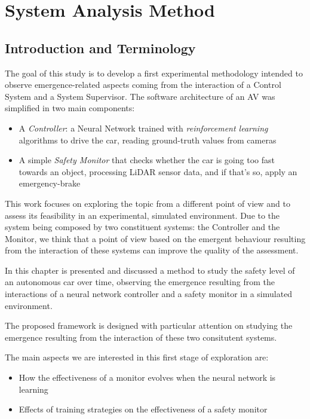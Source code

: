 \chapter{System Analysis Method}

\section{Introduction and Terminology}

The goal of this study is to develop a first experimental methodology intended to observe emergence-related aspects coming from the interaction of a Control System and a System Supervisor.\newline
The software architecture of an AV was simplified in two main components:

\begin{itemize}
	\item A \textsl{Controller}: a Neural Network trained with \textsl{reinforcement learning} algorithms to drive the car, reading ground-truth values from cameras
	\item A simple \textsl{Safety Monitor} that checks whether the car is going too fast towards an object, processing LiDAR sensor data, and if that's so, apply an emergency-brake
\end{itemize}

This work focuses on exploring the topic from a different point of view and to assess its feasibility in an experimental, simulated environment. Due to the system being composed by two constituent systems: the Controller and the Monitor, we think that a point of view based on the emergent behaviour resulting from the interaction of these systems can improve the quality of the assessment.

In this chapter is presented and discussed a method to study the safety level of an autonomous car over time, observing the emergence resulting from the interactions of a neural network controller and a safety monitor in a simulated environment.

The proposed framework is designed with particular attention on studying the emergence resulting from the interaction of these two consitutent systems.

The main aspects we are interested in this first stage of exploration are:

\begin{itemize}
	\item How the effectiveness of a monitor evolves when the neural network is learning
	\item Effects of training strategies on the effectiveness of a safety monitor
\end{itemize}

